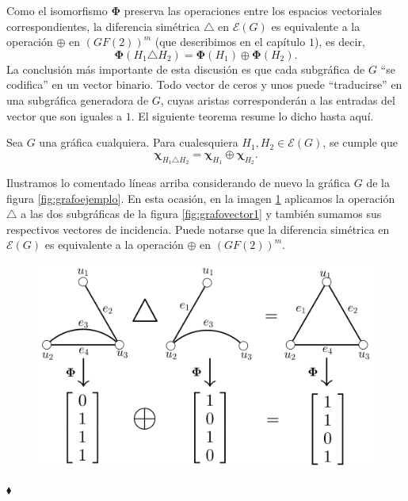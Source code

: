 Como el isomorfismo $\boldsymbol{\Phi}$ preserva las operaciones entre los espacios vectoriales correspondientes, la diferencia simétrica $\triangle$ en $\mathcal{E}(G)$ es equivalente a la operación $\oplus$ en $(GF(2))^{m}$ (que describimos en el capítulo $1$), es decir, $$\boldsymbol{\Phi}(H_{1} \triangle H_{2}) = \boldsymbol{\Phi}(H_{1}) \oplus \boldsymbol{\Phi}(H_{2}).$$ La conclusión más importante de esta discusión es que cada subgráfica de $G$ ``se codifica'' en un vector binario. Todo vector de ceros y unos puede ``traducirse'' en una subgráfica generadora de $G$, cuyas aristas corresponderán a las entradas del vector que son iguales a $1$. El siguiente teorema resume lo dicho hasta aquí.


\begin{teo} \label{teo:xor}
Sea $G$ una gráfica cualquiera. Para cualesquiera $H_{1}, H_{2} \in \mathcal{E}(G)$, se cumple que $$\boldsymbol{\chi}_{H_{1} \triangle H_{2}} = \boldsymbol{\chi}_{H_1} \oplus \boldsymbol{\chi}_{H_2}.$$
\end{teo}

\begin{ejem}
Ilustramos lo comentado líneas arriba considerando de nuevo la gráfica $G$ de la figura \ref{fig:grafoejemplo}. En esta ocasión, en la imagen \ref{fig:operacionesisomorfismo} aplicamos la operación $\triangle$ a las dos subgráficas de la figura \ref{fig:grafovector1} y también sumamos sus respectivos vectores de incidencia. Puede notarse que la diferencia simétrica en $\mathcal{E}(G)$ es equivalente a la operación $\oplus$ en $(GF(2))^{m}$. 

\begin{figure}[H]
    \centering
    \includegraphics[scale=0.2]{img/imgchapter3/operacionesisomorfismo.jpg}
    \caption{}
    \label{fig:operacionesisomorfismo}
\end{figure}

\hfill $\blacklozenge$
\end{ejem}

